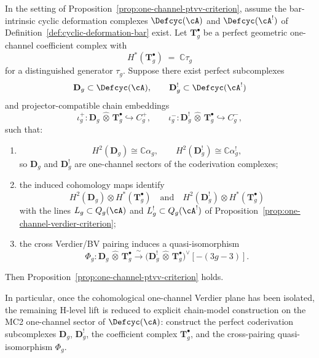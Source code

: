 \begin{proposition}\label{prop:one-channel-chain-model-criterion}
In the setting of
Proposition~\textup{\ref{prop:one-channel-ptvv-criterion}}, assume the
bar-intrinsic cyclic deformation complexes
$\Defcyc(\cA)$ and $\Defcyc(\cA^!)$ of
Definition~\textup{\ref{def:cyclic-deformation-bar}} exist.
Let $\mathbf{T}_g^\bullet$ be a perfect geometric one-channel
coefficient complex with
\[
H^*(\mathbf{T}_g^\bullet) \;=\; \mathbb{C}\tau_g
\]
for a distinguished generator $\tau_g$.
Suppose there exist perfect subcomplexes
\[
\mathbf{D}_g \subset \Defcyc(\cA),
\qquad
\mathbf{D}_g^! \subset \Defcyc(\cA^!)
\]
and projector-compatible chain embeddings
\[
\iota_g^+ \colon
\mathbf{D}_g \,\widehat{\otimes}\, \mathbf{T}_g^\bullet
\hookrightarrow C_g^+,
\qquad
\iota_g^- \colon
\mathbf{D}_g^! \,\widehat{\otimes}\, \mathbf{T}_g^\bullet
\hookrightarrow C_g^-,
\]
such that:
\begin{enumerate}[label=\textup{(\roman*)}]
\item
  \[
  H^2(\mathbf{D}_g) \cong \mathbb{C}\alpha_g,
  \qquad
  H^2(\mathbf{D}_g^!) \cong \mathbb{C}\alpha_g^!,
  \]
  so $\mathbf{D}_g$ and $\mathbf{D}_g^!$ are one-channel sectors of
  the coderivation complexes;
\item the induced cohomology maps identify
  \[
  H^2(\mathbf{D}_g)\otimes H^*(\mathbf{T}_g^\bullet)
  \quad\text{and}\quad
  H^2(\mathbf{D}_g^!)\otimes H^*(\mathbf{T}_g^\bullet)
  \]
  with the lines $L_g \subset Q_g(\cA)$ and
  $L_g^! \subset Q_g(\cA^!)$ of
  Proposition~\textup{\ref{prop:one-channel-verdier-criterion}};
\item the cross Verdier/BV pairing induces a quasi-isomorphism
  \[
  \Phi_g \colon
  \mathbf{D}_g \,\widehat{\otimes}\, \mathbf{T}_g^\bullet
  \xrightarrow{\;\sim\;}
  \bigl(
    \mathbf{D}_g^! \,\widehat{\otimes}\, \mathbf{T}_g^\bullet
  \bigr)^\vee[-(3g{-}3)].
  \]
\end{enumerate}
Then Proposition~\ref{prop:one-channel-ptvv-criterion} holds.

In particular, once the cohomological one-channel Verdier plane has
been isolated, the remaining H-level lift is reduced to explicit
chain-model construction on the MC2 one-channel sector of
$\Defcyc(\cA)$: construct the perfect coderivation subcomplexes
$\mathbf{D}_g$, $\mathbf{D}_g^!$, the coefficient complex
$\mathbf{T}_g^\bullet$, and the cross-pairing quasi-isomorphism
$\Phi_g$.
\end{proposition}

